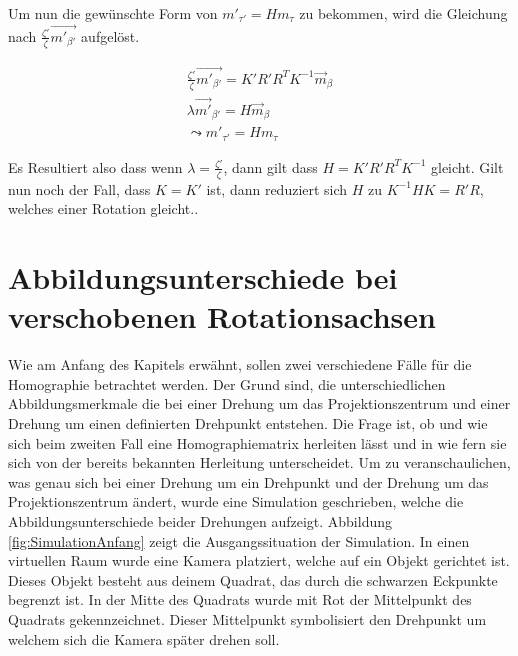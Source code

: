 Um nun die gewünschte Form von $m'_{\tau'} = Hm_{\tau}$ zu bekommen, wird die Gleichung nach $	\frac{\zeta'}{\zeta}\vec{m'_{\beta'}}$ aufgelöst.

\begin{gather}
	\frac{\zeta'}{\zeta}\vec{m'_{\beta'}} = K'R'R^TK^{-1}\vec{m}_\beta\\
\lambda \vec{m'}_{\beta'} = H\vec{m}_\beta\\
\leadsto m'_{\tau'} = H m_\tau
\end{gather}

Es Resultiert also dass wenn $\lambda = \frac{\zeta'}{\zeta}$, dann gilt dass $H = K'R'R^TK^{-1}$ gleicht. Gilt nun noch der Fall, dass $K = K'$ ist, dann reduziert sich $H$ zu $K^{-1}HK = R'R$, welches einer Rotation gleicht.\cite{Elements}. 




\section{Abbildungsunterschiede bei verschobenen Rotationsachsen}

Wie am Anfang des Kapitels erwähnt, sollen zwei verschiedene Fälle für die Homographie betrachtet werden. Der Grund sind, die unterschiedlichen Abbildungsmerkmale die bei einer Drehung um das Projektionszentrum und einer Drehung um einen definierten Drehpunkt entstehen. Die Frage ist, ob und wie sich beim zweiten Fall eine Homographiematrix herleiten lässt und in wie fern sie sich von der bereits bekannten Herleitung unterscheidet. Um zu veranschaulichen, was genau sich bei einer Drehung um ein Drehpunkt und der Drehung um das Projektionszentrum ändert, wurde eine Simulation geschrieben, welche die Abbildungsunterschiede beider Drehungen aufzeigt. Abbildung \ref{fig:SimulationAnfang} zeigt die Ausgangssituation der Simulation. In einen virtuellen Raum wurde eine Kamera platziert, welche auf ein Objekt gerichtet ist. Dieses Objekt besteht aus deinem Quadrat, das durch die schwarzen Eckpunkte begrenzt ist. In der Mitte des Quadrats wurde mit Rot der Mittelpunkt des Quadrats gekennzeichnet. Dieser Mittelpunkt symbolisiert den Drehpunkt um welchem sich die Kamera später drehen soll. 

